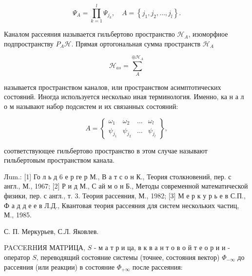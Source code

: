 \documentclass[10pt]{article}
\begin{document}
\[

\Psi_{A}=\prod_{k=1}^{l} \Psi_{j_{k}}, \quad A=\left\{j_{1}, j_{2}, \ldots, j_{l}\right\} .

\]



Каналом рассеяния называется гильбертово пространство $\mathscr{H}_{A}$, изоморфное подпространству $P_{A} \mathscr{H}$. Прямая ортогональная сумма пространств $\mathscr{H}_{A}$



\[

\mathscr{H}_{a s}=\sum_{A}^{\oplus \mathscr{H}_{A}}

\]



называется пространством каналов, или пространством асимптотических состояний. Иногда используется несколько иная терминология. Именно, ка н а л о м называют набор подсистем и их связанных состояний:



\[

A=\left\{\begin{array}{cccc}

\omega_{1} & \omega_{2} & \ldots & \omega_{l} \\

\psi_{j_{1}} & \psi_{j_{2}} & \ldots & \psi_{j_{l}}

\end{array}\right\},

\]



соответствующее гильбертово пространство в этом случае называют гильбертовым пространством канала.



Лum.: [1] Го л ь д 6 е р ге р М., В а т с о н К., Теория столкновений, пер. с англ., М., 1967; [2] Р и д М., С ай м о н Б., Методы современной математической физики, пер. с англ., т. 3. Теория рассеяния, М., 1982; [3] М е р к у р ь е в С.П., Ф а д д е е в Л.Д., Квантовая теория рассеяния для систем нескольких частиц, М., 1985.



С. П. Меркурьев, С.Л. Яковлев.



PACCERHИЯ МАТPИЦА, $S$ - м а т р и ца, в к в а н т о в о й т е о р и и - оператор $S$, переводящий состояние системы (точнее, состояния вектор) $\Phi_{-\infty}$ до рассеяния (или реакции) в состояние $\Phi_{+\infty}$ после рассеяния:
\end{document}
